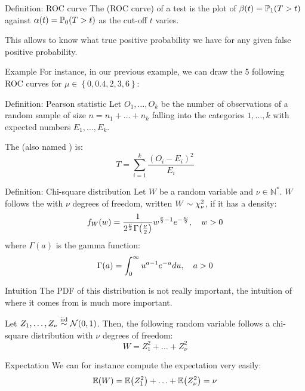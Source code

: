 \documentclass[a4paper]{article}
\begin{document}
\begin{parag}{Definition: ROC curve}
    The  (ROC curve) of a test is the plot of $\beta\left(t\right) = \prob_1\left(T > t\right)$ against $\alpha\left(t\right) = \prob_0\left(T > t\right)$ as the cut-off $t$ varies.

    This allows to know what true positive probability we have for any given false positive probability.

    \begin{subparag}{Example}
        For instance, in our previous example, we can draw the 5 following ROC curves for $\mu \in \left\{0, 0.4, 2, 3, 6\right\}$:
    \end{subparag}
\end{parag}

\begin{parag}{Definition: Pearson statistic}
    Let $O_1, \ldots, O_k$ be the number of observations of a random sample of size $n = n_1+ \ldots + n_k$ falling into the categories $1, \ldots, k$ with expected numbers $E_1, \ldots, E_k$.

    The  (also named ) is: 
    \[T = \sum_{i=1}^{k} \frac{\left(O_i - E_i\right)^2}{E_i}\]
\end{parag}

\begin{parag}{Definition: Chi-square distribution}
    Let $W$ be a random variable and $\nu \in \mathbb{N}^*$. $W$ follows the  with $\nu$ degrees of freedom, written $W \sim \chi^2_{\nu}$, if it has a density: 
    \[f_W\left(w\right) = \frac{1}{2^{\frac{\nu}{2}} \Gamma\left(\frac{\nu}{2}\right)} w^{\frac{\nu}{2} - 1} e^{-\frac{w}{2}}, \mathspace w > 0\]
    where $\Gamma\left(a\right)$ is the gamma function: 
    \[\Gamma\left(a\right) = \int_{0}^{\infty} u^{a-1}e^{-u}du, \mathspace a > 0\]
    
    \begin{subparag}{Intuition}
        The PDF of this distribution is not really important, the intuition of where it comes from is much more important.

        Let $Z_1, \ldots, Z_{\nu} \iid \mathcal{N}\left(0, 1\right)$. Then, the following random variable follows a chi-square distribution with $\nu$ degrees of freedom: 
        \[W = Z_1^2 + \ldots + Z_{\nu}^2\]
    \end{subparag}

    \begin{subparag}{Expectation}
        We can for instance compute the expectation very easily: 
        \[\exval\left(W\right) = \exval\left(Z_1^2\right) + \ldots + \exval\left(Z_{\nu}^2\right) = \nu\]
    \end{subparag}
\end{parag}
\end{document}
